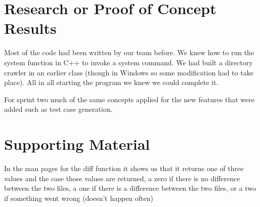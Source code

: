 \section{Research or Proof of Concept Results}
Most of the code had been written by our team before.   We knew how to run the system 
function in C++ to invoke a system command. We had built a directory crawler in an earlier 
class (though in Windows so some modification had to take place).   All in all starting the 
program we knew we could complete it.

For sprint two much of the same concepts applied for the new features that were added such as
test case generation.

\section{Supporting Material}


In the man pages for the diff function it shows us that it returns one of three values and 
the case those values are returned, a zero if there is no difference between the two files, 
a one if there is a difference between the two files, or a two if something went wrong (doesn't happen often)

